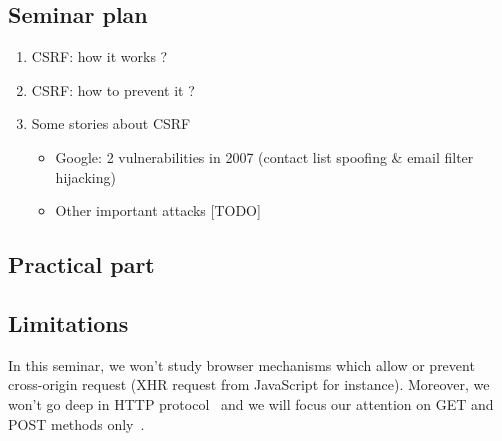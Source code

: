 \documentclass[a4paper,11pt]{article}
\begin{document}
  \subsection{Seminar plan}
  
  \begin{enumerate}
   \item CSRF: how it works ?
   \item CSRF: how to prevent it ?
   \item Some stories about CSRF
   \begin{itemize}
    \item Google: 2 vulnerabilities in 2007 (contact list spoofing \& email filter hijacking)
    \item Other important attacks [TODO] %
   \end{itemize}
  \end{enumerate}
  
  \subsection{Practical part}
  
  
  \subsection{Limitations}

  In this seminar, we won't study browser mechanisms which allow or prevent cross-origin 
  request (XHR request from JavaScript for instance). Moreover, we won't go deep in HTTP 
  protocol~\cite{rfc2616} and we will focus our attention on GET and POST methods only~\cite[5.1.1]{rfc2616}.
  


\end{document}
